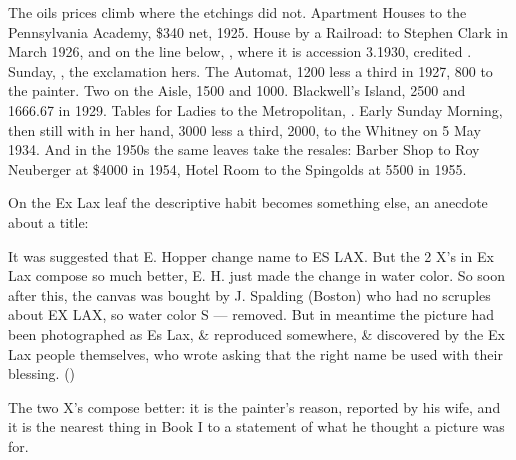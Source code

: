 The oils prices climb where the etchings did not. Apartment Houses to the Pennsylvania Academy, \$340 net, 1925. House by a Railroad:  to Stephen Clark in March 1926, and on the line below, , where it is accession 3.1930, credited . Sunday, , the exclamation hers. The Automat, 1200 less a third in 1927, 800 to the painter. Two on the Aisle, 1500 and 1000. Blackwell's Island, 2500 and 1666.67 in 1929. Tables for Ladies to the Metropolitan, . Early Sunday Morning, then still  with  in her hand, 3000 less a third, 2000, to the Whitney on 5 May 1934. And in the 1950s the same leaves take the resales: Barber Shop to Roy Neuberger at \$4000 in 1954, Hotel Room to the Spingolds at 5500 in 1955.

On the Ex Lax leaf the descriptive habit becomes something else, an anecdote about a title:

\begin{leafquote}
It was suggested that E. Hopper change name to ES LAX. But the 2 X's in Ex Lax compose so much better, E. H. just made the change in water color. So soon after this, the canvas was bought by J. Spalding (Boston) who had no scruples about EX LAX, so water color S --- removed. But in meantime the picture had been photographed as Es Lax, \& reproduced somewhere, \& discovered by the Ex Lax people themselves, who wrote asking that the right name be used with their blessing. \hfill ()
\end{leafquote}

\noindent The two X's compose better: it is the painter's reason, reported by his wife, and it is the nearest thing in Book I to a statement of what he thought a picture was for.

